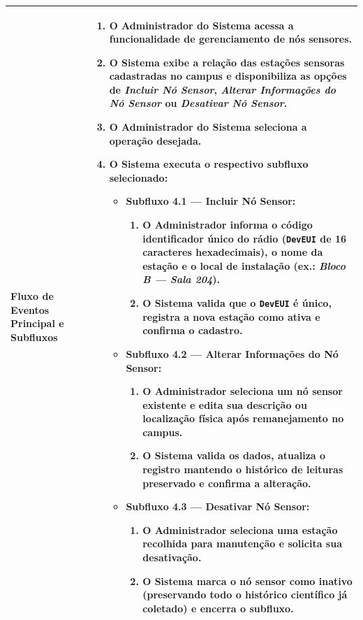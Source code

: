 \documentclass[11pt, a4paper]{article}
\begin{document}
\begin{longtable}{|>{\bfseries}p{3.8cm}|p{12.2cm}|}
Fluxo de Eventos Principal e Subfluxos & 
\begin{enumerate}[nosep, leftmargin=0.5cm]
    \item O Administrador do Sistema acessa a funcionalidade de gerenciamento de nós sensores.
    \item O Sistema exibe a relação das estações sensoras cadastradas no campus e disponibiliza as opções de \emph{Incluir Nó Sensor}, \emph{Alterar Informações do Nó Sensor} ou \emph{Desativar Nó Sensor}.
    \item O Administrador do Sistema seleciona a operação desejada.
    \item O Sistema executa o respectivo subfluxo selecionado:
    \begin{itemize}[nosep, leftmargin=0.5cm]
        \item \textbf{Subfluxo 4.1 --- Incluir Nó Sensor:}
        \begin{enumerate}[nosep, leftmargin=0.5cm]
            \item O Administrador informa o código identificador único do rádio (\texttt{DevEUI} de 16 caracteres hexadecimais), o nome da estação e o local de instalação (ex.: \emph{Bloco B --- Sala 204}).
            \item O Sistema valida que o \texttt{DevEUI} é único, registra a nova estação como ativa e confirma o cadastro.
        \end{enumerate}
        \item \textbf{Subfluxo 4.2 --- Alterar Informações do Nó Sensor:}
        \begin{enumerate}[nosep, leftmargin=0.5cm]
            \item O Administrador seleciona um nó sensor existente e edita sua descrição ou localização física após remanejamento no campus.
            \item O Sistema valida os dados, atualiza o registro mantendo o histórico de leituras preservado e confirma a alteração.
        \end{enumerate}
        \item \textbf{Subfluxo 4.3 --- Desativar Nó Sensor:}
        \begin{enumerate}[nosep, leftmargin=0.5cm]
            \item O Administrador seleciona uma estação recolhida para manutenção e solicita sua desativação.
            \item O Sistema marca o nó sensor como inativo (preservando todo o histórico científico já coletado) e encerra o subfluxo.
        \end{enumerate}
    \end{itemize}
\end{enumerate} \\ \hline


\end{longtable}
\end{document}
